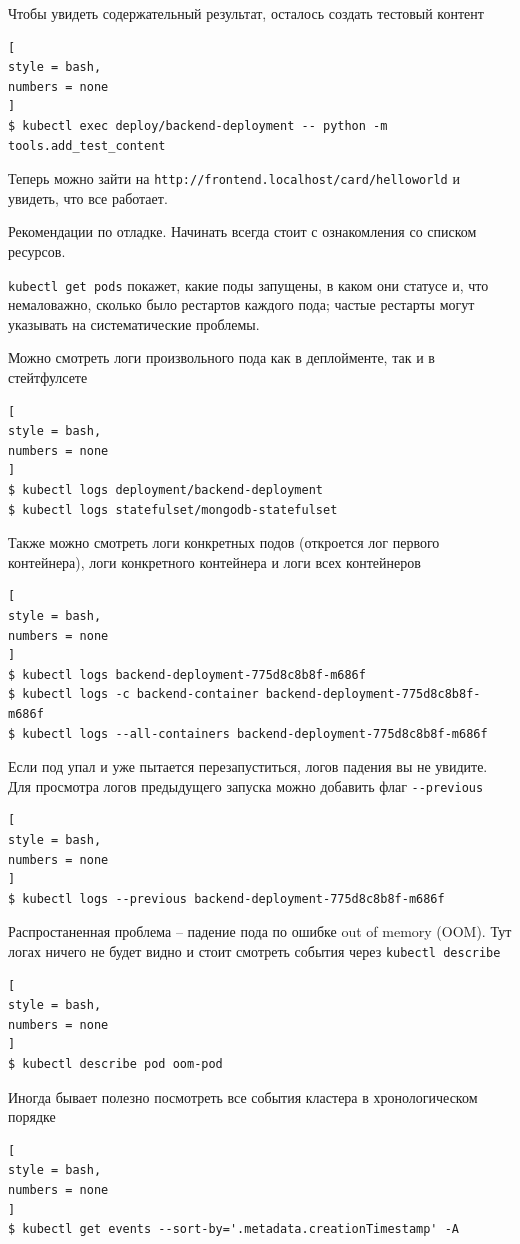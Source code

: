 \documentclass[%
	11pt,
	a4paper,
	utf8,
		]{article}
\begin{document}
Чтобы увидеть содержательный результат, осталось создать тестовый контент
\begin{lstlisting}[
style = bash,
numbers = none
]
$ kubectl exec deploy/backend-deployment -- python -m tools.add_test_content
\end{lstlisting}

Теперь можно зайти на \verb*|http://frontend.localhost/card/helloworld| и увидеть, что все работает.

Рекомендации по отладке. Начинать всегда стоит с ознакомления со списком ресурсов. 

\verb|kubectl get pods| покажет, какие поды запущены, в каком они статусе и, что немаловажно, сколько было рестартов каждого пода; частые рестарты могут указывать на систематические проблемы.

Можно смотреть логи произвольного пода как в деплойменте, так и в стейтфулсете
\begin{lstlisting}[
style = bash,
numbers = none
]
$ kubectl logs deployment/backend-deployment
$ kubectl logs statefulset/mongodb-statefulset
\end{lstlisting}

Также можно смотреть логи конкретных подов (откроется лог первого контейнера), логи конкретного контейнера и логи всех контейнеров
\begin{lstlisting}[
style = bash,
numbers = none
]
$ kubectl logs backend-deployment-775d8c8b8f-m686f
$ kubectl logs -c backend-container backend-deployment-775d8c8b8f-m686f
$ kubectl logs --all-containers backend-deployment-775d8c8b8f-m686f
\end{lstlisting}

Если под упал и уже пытается перезапуститься, логов падения вы не увидите. Для просмотра логов предыдущего запуска можно добавить флаг \verb*|--previous|
\begin{lstlisting}[
style = bash,
numbers = none
]
$ kubectl logs --previous backend-deployment-775d8c8b8f-m686f
\end{lstlisting}

Распростаненная проблема -- падение пода по ошибке out of memory (OOM). Тут логах ничего не будет видно и стоит смотреть события через \verb|kubectl describe|
\begin{lstlisting}[
style = bash,
numbers = none
]
$ kubectl describe pod oom-pod
\end{lstlisting}

Иногда бывает полезно посмотреть все события кластера в хронологическом порядке
\begin{lstlisting}[
style = bash,
numbers = none
]
$ kubectl get events --sort-by='.metadata.creationTimestamp' -A
\end{lstlisting}
\end{document}
